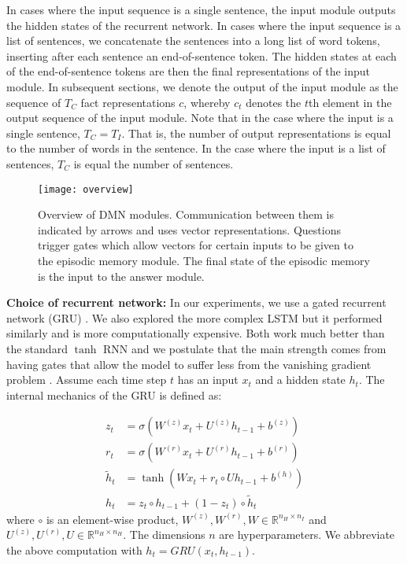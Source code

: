 \documentclass{article}
\begin{document}
In cases where the input sequence is a single sentence, the input module outputs the hidden states of the recurrent network. In cases where the input sequence is a list of sentences, we concatenate the sentences into a long list of word tokens, inserting after each sentence an end-of-sentence token. The hidden states at each of the end-of-sentence tokens are then the final representations of the input module. In subsequent sections, we denote the output of the input module as the sequence of $T_C$ fact representations $c$, whereby $c_t$ denotes the $t$th element in the output sequence of the input module. Note that in the case where the input is a single sentence, $T_C = T_I$. That is, the number of output representations is equal to the number of words in the sentence. In the case where the input is a list of sentences, $T_C$ is equal the number of sentences.

\begin{figure}[t!]
\centering
\texttt{[image: overview]}
\label{fig:DMN}
\caption{Overview of DMN modules. Communication between them is indicated by arrows and uses vector representations. Questions trigger gates which allow vectors for certain inputs to be given to the episodic memory module. The final state of the episodic memory is the input to the answer module.}
\vspace{-0.3cm}
\end{figure}

\textbf{Choice of recurrent network:}
In our experiments, we use a gated recurrent network (GRU) \cite{Cho2014,Chung2014}. We also explored the more complex LSTM \cite{Hochreiter1997} but it performed similarly and is more computationally expensive. Both work much better than the standard $\tanh$ RNN and we postulate that the main strength comes from having gates that allow the model to suffer less from the vanishing gradient problem \cite{Hochreiter1997}. Assume each time step $t$ has an input $x_t$ and a hidden state $h_t$. The internal mechanics of the GRU is defined as:

\begin{align}
z_t &= \sigma\left(W^{(z)}x_{t} + U^{(z)} h_{t-1}  + b^{(z)} \right)\\
r_t &= \sigma\left(W^{(r)}x_{t} + U^{(r)} h_{t-1} + b^{(r)} \right)\\
\tilde{h}_t &=  \tanh\left(Wx_{t} + r_t \circ U h_{t-1}  + b^{(h)}\right)\\
h_t &=  z_t\circ h_{t-1} + (1-z_t) \circ \tilde{h}_t
\end{align}
where $\circ$ is an element-wise product, $W^{(z)}, W^{(r)}, W \in \mathbb{R}^{n_H \times n_I}$ and $U^{(z)}, U^{(r)}, U \in \mathbb{R}^{n_H \times n_H}$. The dimensions $n$ are hyperparameters. We abbreviate the above computation with $h_t = GRU(x_t,h_{t-1})$.
\end{document}
